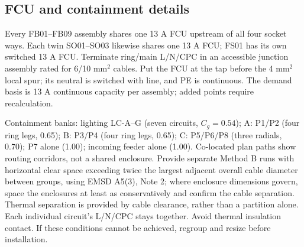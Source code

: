 \subsection*{FCU and containment details}
Every FB01--FB09 assembly shares one 13 A FCU upstream of all four socket ways. Each twin SO01--SO03 likewise shares one 13 A FCU; FS01 has its own switched 13 A FCU. Terminate ring/main L/N/CPC in an accessible junction assembly rated for 6/10 mm$^2$ cables. Put the FCU at the tap before the 4 mm$^2$ local spur; its neutral is switched with line, and PE is continuous. The demand basis is 13 A continuous capacity per assembly; added points require recalculation.

Containment banks: lighting LC-A--G (seven circuits, $C_g=0.54$); A: P1/P2 (four ring legs, 0.65); B: P3/P4 (four ring legs, 0.65); C: P5/P6/P8 (three radials, 0.70); P7 alone (1.00); incoming feeder alone (1.00). Co-located plan paths show routing corridors, not a shared enclosure. Provide separate Method B runs with horizontal clear space exceeding twice the largest adjacent overall cable diameter between groups, using EMSD A5(3), Note 2; where enclosure dimensions govern, space the enclosures at least as conservatively and confirm the cable separation. Thermal separation is provided by cable clearance, rather than a partition alone. Each individual circuit's L/N/CPC stays together. Avoid thermal insulation contact. If these conditions cannot be achieved, regroup and resize before installation.

